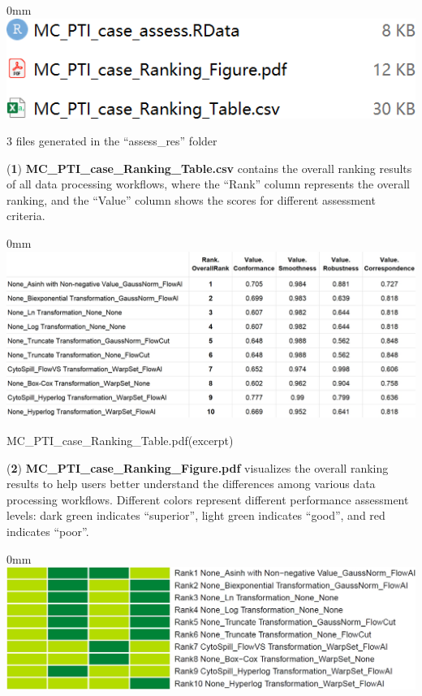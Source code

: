 \documentclass[]{article}
\begin{document}
\begin{adjustwidth}{\fltoffset}{0mm}
\includegraphics[width=0.5\linewidth,style="margin-left: 30px;"]{figures/assess_res_file} \end{adjustwidth}

3 files generated in the ``assess\_res'' folder

(\textbf{1}) \textbf{MC\_PTI\_case\_Ranking\_Table.csv} contains the overall ranking results of all data processing workflows, where the ``Rank'' column represents the overall ranking, and the ``Value'' column shows the scores for different assessment criteria.

\begin{adjustwidth}{\fltoffset}{0mm}
\includegraphics[width=0.95\linewidth,style="margin-left: 30px;"]{figures/assess_res_table} \end{adjustwidth}

MC\_PTI\_case\_Ranking\_Table.pdf(excerpt)

(\textbf{2}) \textbf{MC\_PTI\_case\_Ranking\_Figure.pdf} visualizes the overall ranking results to help users better understand the differences among various data processing workflows. Different colors represent different performance assessment levels: dark green indicates ``superior'', light green indicates ``good'', and red indicates ``poor''.

\begin{adjustwidth}{\fltoffset}{0mm}
\includegraphics[width=0.9\linewidth,style="margin-left: 30px;"]{figures/assess_res_figure} \end{adjustwidth}
\end{document}
